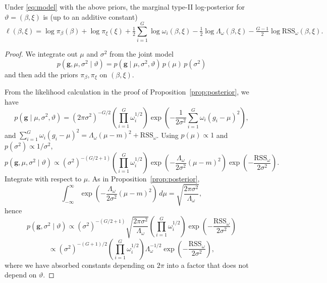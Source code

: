\begin{theorem}
\label{thm:EB-obj}
Under \eqref{eq:model} with the above priors, the marginal type-II log-posterior for \(\vartheta=(\beta,\xi)\) is (up to an additive constant)
\begin{equation}
\label{eq:EB-obj}
\ell(\beta,\xi)
=\log \pi_\beta(\beta)+\log \pi_\xi(\xi)
+\tfrac{1}{2}\sum_{i=1}^G \log \omega_i(\beta,\xi)
-\tfrac{1}{2}\log \Lambda_\omega(\beta,\xi)
-\tfrac{G-1}{2}\log \mathrm{RSS}_\omega(\beta,\xi).
\end{equation}
\end{theorem}
\begin{proof}
We integrate out \(\mu\) and \(\sigma^2\) from the joint model
\[
p(\mathbf g,\mu,\sigma^2\mid\vartheta)
=p(\mathbf g\mid\mu,\sigma^2,\vartheta)\,p(\mu)\,p(\sigma^2)
\]
and then add the priors \(\pi_\beta,\pi_\xi\) on \((\beta,\xi)\).

From the likelihood calculation in the proof of Proposition~\ref{prop:posterior}, we have
\[
p(\mathbf g\mid \mu,\sigma^2,\vartheta)
=(2\pi\sigma^2)^{-G/2}\left(\prod_{i=1}^G \omega_i^{1/2}\right)
\exp\!\left(-\frac{1}{2\sigma^2}\sum_{i=1}^G \omega_i(g_i-\mu)^2\right),
\]
and
\(\sum_{i=1}^G \omega_i(g_i-\mu)^2
=\Lambda_\omega(\mu-m)^2+\mathrm{RSS}_\omega\).
Using \(p(\mu)\propto 1\) and \(p(\sigma^2)\propto 1/\sigma^2\),
\[
p(\mathbf g,\mu,\sigma^2\mid\vartheta)
\propto
(\sigma^2)^{-(G/2+1)}
\left(\prod_{i=1}^G \omega_i^{1/2}\right)
\exp\!\left(-\frac{\Lambda_\omega}{2\sigma^2}(\mu-m)^2\right)
\exp\!\left(-\frac{\mathrm{RSS}_\omega}{2\sigma^2}\right).
\]
Integrate with respect to \(\mu\).
As in Proposition~\ref{prop:posterior},
\[
\int_{-\infty}^\infty
\exp\!\left(-\frac{\Lambda_\omega}{2\sigma^2}(\mu-m)^2\right)\,d\mu
=\sqrt{\frac{2\pi\sigma^2}{\Lambda_\omega}},
\]
hence
\[
p(\mathbf g,\sigma^2\mid\vartheta)
\propto
(\sigma^2)^{-(G/2+1)}
\sqrt{\frac{2\pi\sigma^2}{\Lambda_\omega}}
\left(\prod_{i=1}^G \omega_i^{1/2}\right)
\exp\!\left(-\frac{\mathrm{RSS}_\omega}{2\sigma^2}\right)
\]
\[
\propto
(\sigma^2)^{-(G+1)/2}
\left(\prod_{i=1}^G \omega_i^{1/2}\right)
\Lambda_\omega^{-1/2}
\exp\!\left(-\frac{\mathrm{RSS}_\omega}{2\sigma^2}\right),
\]
where we have absorbed constants depending on \(2\pi\) into a factor that does not depend on \(\vartheta\).


\end{proof}

